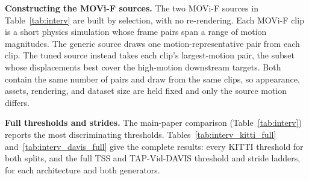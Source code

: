 \documentclass[runningheads]{llncs}
\newcommand{\pck}{PCK}
\begin{document}
\begin{table}[h]
\centering
\caption{\textbf{A target-tuned source beats the generic baseline, every
configuration.} Full version of main-paper Table~\ref{tab:interv}, adding the
from-scratch backbone rows (the OOD probe of this section). Peak \pck{} of the
render-free \emph{tuned} KITTI-recovered source vs.\ the generic MOVi-F baseline,
by architecture and backbone (\emph{scratch} $=$ backbone trained from scratch;
\emph{pretrained} $=$ frozen pretrained backbone; RAFT is end-to-end). $\Delta =$
tuned $-$ MOVi-F; bold marks a win.}
\label{tab:interv_full}
\small
\setlength{\tabcolsep}{5pt}
\resizebox{\linewidth}{!}{}
\end{table}

\noindent\textbf{Constructing the MOVi-F sources.} The two MOVi-F sources in
Table~\ref{tab:interv} are built by selection, with no re-rendering. Each MOVi-F
clip is a short physics simulation whose frame pairs span a range of motion
magnitudes. The generic source draws one motion-representative pair from each
clip. The tuned source instead takes each clip's largest-motion pair, the subset
whose displacements best cover the high-motion downstream targets. Both contain
the same number of pairs and draw from the same clips, so appearance, assets,
rendering, and dataset size are held fixed and only the source motion differs.

\noindent\textbf{Full thresholds and strides.} The main-paper comparison
(Table~\ref{tab:interv}) reports the most discriminating thresholds.
Tables~\ref{tab:interv_kitti_full} and~\ref{tab:interv_davis_full} give the
complete results: every KITTI threshold for both splits, and the full TSS and
TAP-Vid-DAVIS threshold and stride ladders, for each architecture and both
generators.

\begin{table}[h]
\centering
\caption{\textbf{KITTI, all thresholds.} Peak \pck{} (\%) at
$\alpha\in\{.05,.03,.01\}$ for KITTI-2012 and KITTI-2015, by architecture and
generator. Full threshold ladder for the KITTI columns of main-paper
Table~\ref{tab:interv}.}
\label{tab:interv_kitti_full}
\small
\setlength{\tabcolsep}{5pt}
\resizebox{\linewidth}{!}{}
\end{table}

\begin{table}[h]
\centering
\caption{\textbf{TSS and TAP-Vid-DAVIS, all thresholds and strides.} Peak \pck{} on
TSS ($\alpha\in\{.10,.05,.03\}$) and TAP-Vid-DAVIS (PCK@$5\%$ by stride
$s\in\{1,2,4,8,16\}$), by architecture and generator. Full ladder for the TSS and
DAVIS columns of main-paper Table~\ref{tab:interv}.}
\label{tab:interv_davis_full}
\small
\setlength{\tabcolsep}{4pt}
\resizebox{\linewidth}{!}{}
\end{table}
\end{document}
